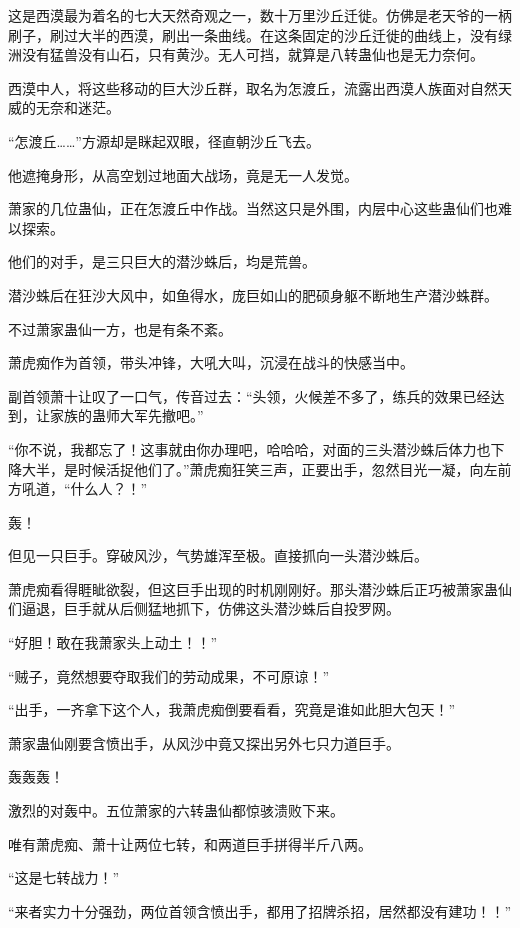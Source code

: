 
\begin{this_body}

这是西漠最为着名的七大天然奇观之一，数十万里沙丘迁徙。仿佛是老天爷的一柄刷子，刷过大半的西漠，刷出一条曲线。在这条固定的沙丘迁徙的曲线上，没有绿洲没有猛兽没有山石，只有黄沙。无人可挡，就算是八转蛊仙也是无力奈何。

西漠中人，将这些移动的巨大沙丘群，取名为怎渡丘，流露出西漠人族面对自然天威的无奈和迷茫。

“怎渡丘……”方源却是眯起双眼，径直朝沙丘飞去。

他遮掩身形，从高空划过地面大战场，竟是无一人发觉。

萧家的几位蛊仙，正在怎渡丘中作战。当然这只是外围，内层中心这些蛊仙们也难以探索。

他们的对手，是三只巨大的潜沙蛛后，均是荒兽。

潜沙蛛后在狂沙大风中，如鱼得水，庞巨如山的肥硕身躯不断地生产潜沙蛛群。

不过萧家蛊仙一方，也是有条不紊。

萧虎痴作为首领，带头冲锋，大吼大叫，沉浸在战斗的快感当中。

副首领萧十让叹了一口气，传音过去：“头领，火候差不多了，练兵的效果已经达到，让家族的蛊师大军先撤吧。”

“你不说，我都忘了！这事就由你办理吧，哈哈哈，对面的三头潜沙蛛后体力也下降大半，是时候活捉他们了。”萧虎痴狂笑三声，正要出手，忽然目光一凝，向左前方吼道，“什么人？！”

轰！

但见一只巨手。穿破风沙，气势雄浑至极。直接抓向一头潜沙蛛后。

萧虎痴看得睚眦欲裂，但这巨手出现的时机刚刚好。那头潜沙蛛后正巧被萧家蛊仙们逼退，巨手就从后侧猛地抓下，仿佛这头潜沙蛛后自投罗网。

“好胆！敢在我萧家头上动土！！”

“贼子，竟然想要夺取我们的劳动成果，不可原谅！”

“出手，一齐拿下这个人，我萧虎痴倒要看看，究竟是谁如此胆大包天！”

萧家蛊仙刚要含愤出手，从风沙中竟又探出另外七只力道巨手。

轰轰轰！

激烈的对轰中。五位萧家的六转蛊仙都惊骇溃败下来。

唯有萧虎痴、萧十让两位七转，和两道巨手拼得半斤八两。

“这是七转战力！”

“来者实力十分强劲，两位首领含愤出手，都用了招牌杀招，居然都没有建功！！”


\end{this_body}
